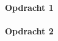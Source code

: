 \documentclass[a4paper,
headings=standardclasses
]{scrartcl}
\title{} %
\date{} %
\author{} %
\theoremstyle{remark}
\theoremstyle{definition}
\begin{document}
\paragraph*{Opdracht 1} %


\paragraph*{Opdracht 2} %
	
	
	
\end{document}
